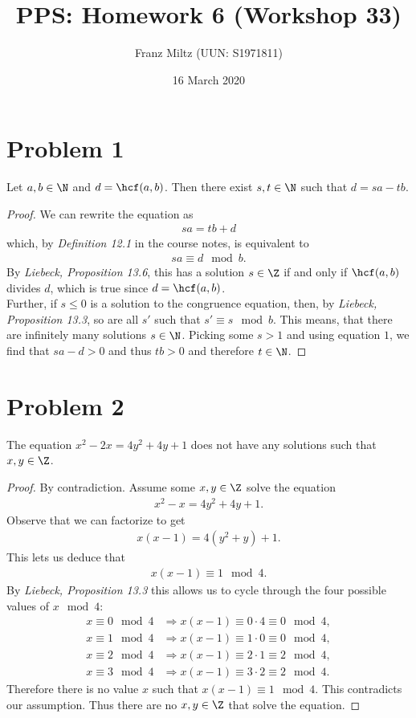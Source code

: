 \documentclass{article}
\title{PPS: Homework 6 (Workshop 33)}
\author{Franz Miltz (UUN: S1971811)}
\date{16 March 2020}
\begin{document}
\maketitle
\section*{Problem 1}
\begin{claim}
  Let $a,b\in\N$ and $d=\hcf(a,b)$. Then there exist $s,t\in\N$ such that $d=sa-tb$.
\end{claim}
\begin{proof}
  We can rewrite the equation as
  \begin{align}
    \label{eq:1}
    sa = tb + d
  \end{align}
  which, by \emph{Definition 12.1} in the course notes, is equivalent to
  \begin{align*}
    sa \equiv d \mod b.
  \end{align*}
  By \emph{Liebeck, Proposition 13.6}, this has a solution $s\in\Z$ if and only if $\hcf(a,b)$ divides $d$, which is true since $d=\hcf(a,b)$.\\
  Further, if $s\leq 0$ is a solution to the congruence equation, then, by \emph{Liebeck, Proposition 13.3}, so are all $s'$ such that $s' \equiv s \mod b$.
  This means, that there are infinitely many solutions $s\in\N$.
  Picking some $s>1$ and using equation $1$, we find that $sa-d>0$ and thus $tb>0$ and therefore $t\in\N$.
\end{proof}
\section*{Problem 2}
\begin{claim}
  The equation $x^2-2x=4y^2+4y+1$ does not have any solutions such that $x,y\in\Z$.
\end{claim}
\begin{proof}
  By contradiction. Assume some $x,y\in\Z$ solve the equation
  \begin{align*}
    x^2-x=4y^2+4y+1.
  \end{align*}
  Observe that we can factorize to get
  \begin{align*}
    x(x-1)=4(y^2+y)+1.
  \end{align*}
  This lets us deduce that
  \begin{align*}
    x(x-1) \equiv 1 \mod 4.
  \end{align*}
  By \emph{Liebeck, Proposition 13.3} this allows us to cycle through the four possible values of $x\mod 4$:
  \begin{align*}
    x\equiv 0 \mod 4 & \Rightarrow x(x-1) \equiv 0\cdot 4 \equiv 0 \mod 4, \\
    x\equiv 1 \mod 4 & \Rightarrow x(x-1) \equiv 1\cdot 0 \equiv 0 \mod 4, \\
    x\equiv 2 \mod 4 & \Rightarrow x(x-1) \equiv 2\cdot 1 \equiv 2 \mod 4, \\
    x\equiv 3 \mod 4 & \Rightarrow x(x-1) \equiv 3\cdot 2 \equiv 2 \mod 4.
  \end{align*}
  Therefore there is no value $x$ such that $x(x-1)\equiv 1 \mod 4$.
  This contradicts our assumption.
  Thus there are no $x,y\in\Z$ that solve the equation.
\end{proof}
\end{document}
